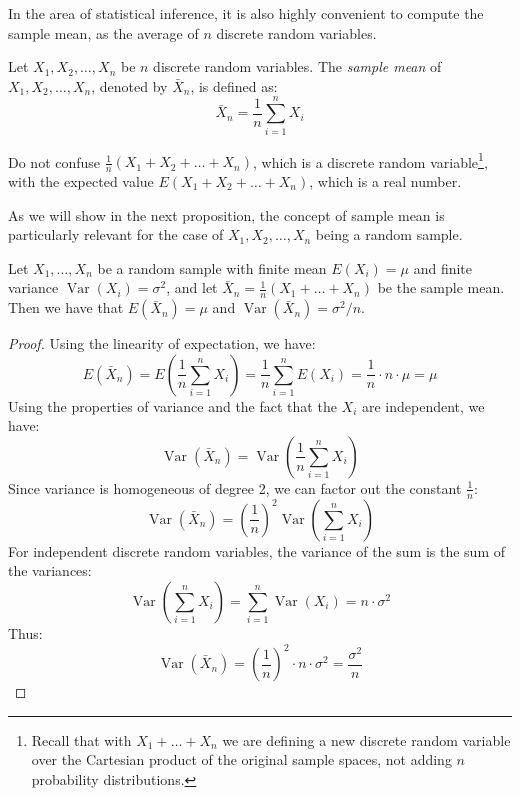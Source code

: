 In the area of statistical inference, it is also highly convenient to compute the sample mean, as the average of \( n \) discrete random variables.

\begin{definition}
Let \( X_1, X_2, \ldots, X_n \) be \( n \) discrete random variables. The \emph{sample mean} of \( X_1, X_2, \ldots, X_n \), denoted by \( \bar{X}_n \), is defined as:
\[
\bar{X}_n = \frac{1}{n} \sum_{i=1}^n X_i
\]
\end{definition}

Do not confuse \( \frac{1}{n} \left( X_1 + X_2 + \ldots + X_n \right) \), which is a discrete random variable\footnote{Recall that with \( X_1 + \ldots + X_n \) we are defining a new discrete random variable over the Cartesian product of the original sample spaces, not adding \( n \) probability distributions.}, with the expected value \( E\left( X_1 + X_2 + \ldots + X_n \right) \), which is a real number.

As we will show in the next proposition, the concept of sample mean is particularly relevant for the case of \( X_1, X_2, \ldots, X_n \) being a random sample.

\begin{proposition}\label{prop:sample_mean}
Let \( X_1, \ldots, X_n \) be a random sample with finite mean \( E\left( X_i \right) = \mu \) and finite variance \( \operatorname{Var}\left( X_i \right) = \sigma^2 \), and let \( \bar{X}_n = \frac{1}{n} \left( X_1 + \ldots + X_n \right) \) be the sample mean. Then we have that \( E\left( \bar{X}_n \right) = \mu \) and \( \operatorname{Var}\left( \bar{X}_n \right) = \sigma^2 / n \).
\end{proposition}
\begin{proof}
Using the linearity of expectation, we have:
\[
E\left( \bar{X}_n \right) = E\left( \frac{1}{n} \sum_{i=1}^{n} X_i \right) = \frac{1}{n} \sum_{i=1}^{n} E\left( X_i \right) = \frac{1}{n} \cdot n \cdot \mu = \mu
\]
Using the properties of variance and the fact that the \( X_i \) are independent, we have:
\[
\operatorname{Var}\left( \bar{X}_n \right) = \operatorname{Var}\left( \frac{1}{n} \sum_{i=1}^{n} X_i \right)
\]
Since variance is homogeneous of degree 2, we can factor out the constant \( \frac{1}{n} \):
\[
\operatorname{Var}\left( \bar{X}_n \right) = \left( \frac{1}{n} \right)^2 \operatorname{Var}\left( \sum_{i=1}^{n} X_i \right)
\]
For independent discrete random variables, the variance of the sum is the sum of the variances:
\[
\operatorname{Var}\left( \sum_{i=1}^{n} X_i \right) = \sum_{i=1}^{n} \operatorname{Var}\left( X_i \right) = n \cdot \sigma^2
\]
Thus:
\[
\operatorname{Var}\left( \bar{X}_n \right) = \left( \frac{1}{n} \right)^2 \cdot n \cdot \sigma^2 = \frac{\sigma^2}{n}
\]
\end{proof}


